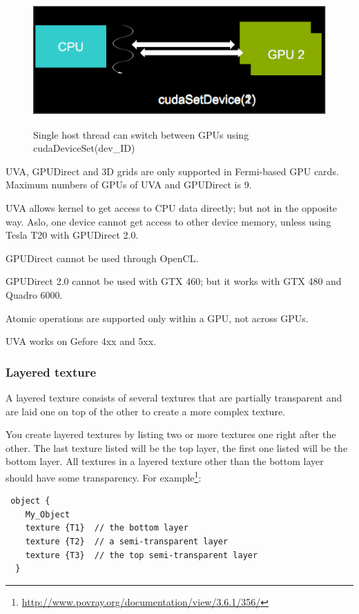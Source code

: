 \begin{figure}[hbt]
   \centerline{\includegraphics[height=5cm,angle=0]{./images/CDF.eps}}
\caption{Single host thread can switch between GPUs using
cudaDeviceSet(dev\_ID)}
\label{fig:hostthread_multipleGPU2}
\end{figure}


\begin{framed}
UVA, GPUDirect and 3D grids are only supported in Fermi-based GPU cards. Maximum
numbers of GPUs of UVA and GPUDirect is 9.

UVA allows kernel to get access to CPU data directly; but not in the opposite
way. Aslo, one device cannot get access to other device memory, unless using
Tesla T20 with GPUDirect 2.0.

GPUDirect cannot be used through OpenCL.

GPUDirect 2.0 cannot be used with GTX 460; but it works with GTX 480 and Quadro
6000.

Atomic operations are supported only within a GPU, not across GPUs.

UVA works on Gefore 4xx and 5xx.
\end{framed}

\subsubsection{Layered texture}
\label{sec:layered_texture}

A layered texture consists of several textures that are partially transparent
and are laid one on top of the other to create a more complex texture. 

You create layered textures by listing two or more textures one right after the
other. The last texture listed will be the top layer, the first one listed will
be the bottom layer. All textures in a layered texture other than the bottom
layer should have some transparency. For
example\footnote{\url{http://www.povray.org/documentation/view/3.6.1/356/}}:
\begin{lstlisting}
 object {
    My_Object
    texture {T1}  // the bottom layer
    texture {T2}  // a semi-transparent layer
    texture {T3}  // the top semi-transparent layer
  }
\end{lstlisting}

